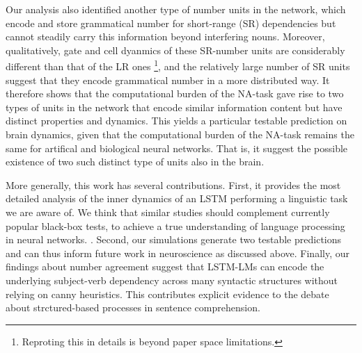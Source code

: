 Our analysis also identified another type of number units in the network, which encode and store grammatical number for short-range (SR) dependencies but cannot steadily carry this information beyond interfering nouns. Moreover, qualitatively, gate and cell dyanmics of these SR-number units are considerably different than that of the LR ones \footnote{Reproting this in details is beyond paper space limitations.}, and the relatively large number of SR units suggest that they encode grammatical number in a more distributed way. It therefore shows that the computational burden of the NA-task gave rise to two types of units in the network that encode similar information content but have distinct properties and dynamics. This yields a particular testable prediction on brain dynamics, given that the computational burden of the NA-task remains the same for artifical and biological neural networks. That is, it suggest the possible existence of two such distinct type of units also in the brain.

More generally, this work has several contributions. First, it provides the most detailed analysis of the inner dynamics of an LSTM performing a linguistic task we are aware of. We think that similar studies should complement currently popular black-box tests, to achieve a true understanding of language processing in neural networks. . Second, our simulations generate two testable predictions and can thus inform future work in neuroscience as discussed above. Finally, our findings about number agreement suggest that LSTM-LMs can encode the underlying subject-verb dependency across many syntactic structures without relying on canny heuristics. This contributes explicit evidence to the debate about strctured-based processes in sentence comprehension.



